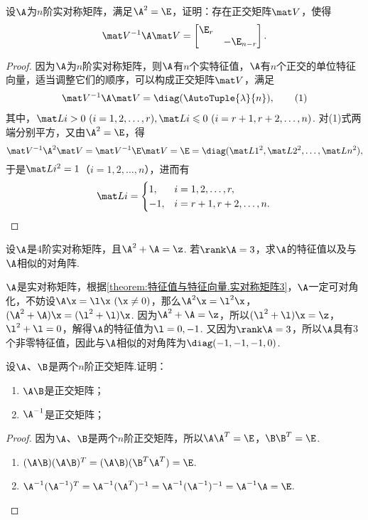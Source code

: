 \begin{example}
设\(\A\)为\(n\)阶实对称矩阵，满足\(\A^2=\E\)，证明：存在正交矩阵\(\Q\)，使得\[
\Q^{-1}\A\Q=\begin{bmatrix} \E_r \\ & -\E_{n-r} \end{bmatrix}.
\]
\begin{proof}
因为\(\A\)为\(n\)阶实对称矩阵，则\(\A\)有\(n\)个实特征值，\(\A\)有\(n\)个正交的单位特征向量，适当调整它们的顺序，可以构成正交矩阵\(\Q\)，满足\begin{gather}
\Q^{-1}\A\Q=\diag(\AutoTuple{\lambda}{n}), \tag1
\end{gather}其中，\(\L{i}>0\ (i=1,2,\dotsc,r),%
\L{i}\leqslant0\ (i=r+1,r+2,\dotsc,n)\).
对(1)式两端分别平方，又由\(\A^2=\E\)，得\[
\Q^{-1}\A^2\Q
= \Q^{-1}\E\Q
= \E
= \diag(\L{1}^2,\L{2}^2,\dotsc,\L{n}^2),
\]于是\(\L{i}^2=1\)（\(i=1,2,\dotsc,n\)），进而有\[
\L{i}= \begin{cases}
1, & i=1,2,\dotsc,r, \\
-1, & i=r+1,r+2,\dotsc,n.
\end{cases}
\qedhere
\]
\end{proof}
\end{example}

\begin{example}
设\(\A\)是4阶实对称矩阵，且\(\A^2+\A=\z\).
若\(\rank\A=3\)，求\(\A\)的特征值以及与\(\A\)相似的对角阵.
\begin{solution}
\(\A\)是实对称矩阵，根据\cref{theorem:特征值与特征向量.实对称矩阵3}，\(\A\)一定可对角化，不妨设\(\A\x=\l\x\ (\x\neq0)\)，那么\(\A^2\x=\l^2\x\)，\((\A^2+\A)\x=(\l^2+\l)\x\).
因为\(\A^2+\A=\z\)，所以\((\l^2+\l)\x=\z\)，\(\l^2+\l=0\)，解得\(\A\)的特征值为\(\l=0,-1\).
又因为\(\rank\A=3\)，所以\(\A\)具有3个非零特征值，因此与\(\A\)相似的对角阵为\(\diag(-1,-1,-1,0)\).
\end{solution}
\end{example}

\begin{example}
设\(\A\)、\(\B\)是两个\(n\)阶正交矩阵.证明：
\begin{enumerate}
\item \(\A\B\)是正交矩阵；
\item \(\A^{-1}\)是正交矩阵；
\end{enumerate}
\begin{proof}
因为\(\A\)、\(\B\)是两个\(n\)阶正交矩阵，所以\(\A\A^T = \E\)，\(\B\B^T = \E\).
\begin{enumerate}
\item \((\A\B)(\A\B)^T
= (\A\B)(\B^T\A^T)
= \E\).
\item \(\A^{-1}(\A^{-1})^T
= \A^{-1} (\A^T)^{-1}
= \A^{-1} (\A^{-1})^{-1}
= \A^{-1} \A
= \E\).
\qedhere
\end{enumerate}
\end{proof}
\end{example}


